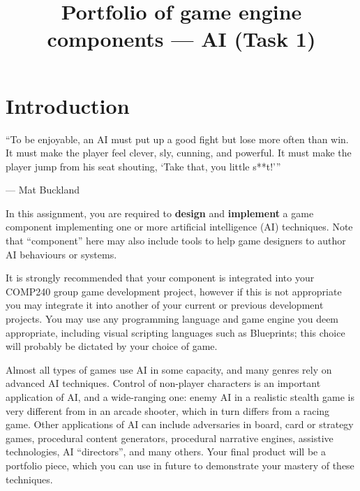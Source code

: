 \title{Portfolio of game engine components --- AI (Task 1)}

\maketitle

\label{p:part1-start}

\section*{Introduction}

\begin{marginquote}
``To be enjoyable, an AI must put up a good fight but lose more often than win. It must make the player feel clever, sly, cunning, and powerful. It must make the player jump from his seat shouting, `Take that, you little s**t!'\thinspace''

--- Mat Buckland
\end{marginquote}

In this assignment, you are required to \textbf{design} and \textbf{implement} a game component
implementing one or more artificial intelligence (AI) techniques.
Note that ``component'' here may also include tools to help game designers to author AI behaviours or systems.

It is strongly recommended that your component is integrated into your COMP240 group game development project,
however if this is not appropriate you may integrate it into another of your current or previous development projects.
You may use any programming language and game engine you deem appropriate,
including visual scripting languages such as Blueprints;
this choice will probably be dictated by your choice of game.

Almost all types of games use AI in some capacity, and many genres rely on advanced AI techniques.
Control of non-player characters is an important application of AI,
and a wide-ranging one: enemy AI in a realistic stealth game is very different from in an arcade shooter,
which in turn differs from a racing game.
Other applications of AI can include adversaries in board, card or strategy games,
procedural content generators,
procedural narrative engines,
assistive technologies,
AI ``directors'',
and many others.
Your final product will be a portfolio piece, which you can use in future to demonstrate your mastery of these techniques.

